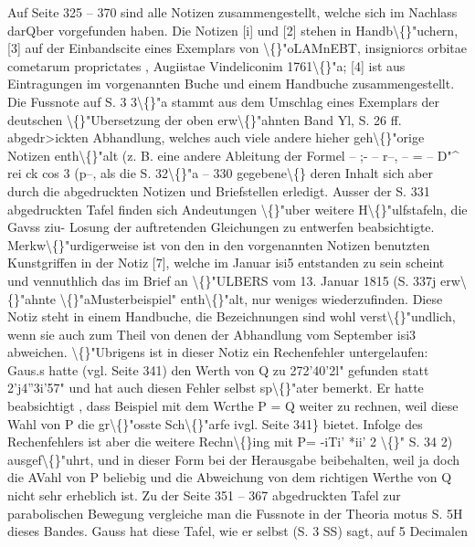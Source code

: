 \documentclass[10pt,a4paper]{article}
\begin{document}
Auf Seite 325 -- 370 sind alle Notizen zusammengestellt, welche sich im Nachlass darQber vorgefunden
haben. Die Notizen [i] und [2] stehen in Handb\textbackslash\{\}"uchern, [3] auf der Einbandscite eines Exemplars von
\textbackslash\{\}"oLAMnEBT, insigniorcs orbitae cometarum proprictates , Augiistae Vindeliconim 1761\textbackslash\{\}"a; [4] ist aus Eintragungen im vorgenannten Buche und einem Handbuche zusammengestellt. Die Fussnote auf S. 3 3\textbackslash\{\}"a stammt
aus dem Umschlag eines Exemplars der deutschen \textbackslash\{\}"Ubersetzung der oben erw\textbackslash\{\}"ahnten Band Yl, S. 26 ff. abgedr>ickten Abhandlung, welches auch viele andere hieher geh\textbackslash\{\}"orige Notizen enth\textbackslash\{\}"alt (z. B. eine andere Ableitung
der Formel -- ;- -- r--, -- = -- D"\textasciicircum{}
rei ck cos
3 (p--, als die S. 32\textbackslash\{\}"a -- 330 gegebene\textbackslash\{\} deren Inhalt sich aber durch die abgedruckten Notizen und Briefstellen erledigt. Ausser der S. 331 abgedruckten Tafel finden sich Andeutungen
\textbackslash\{\}"uber weitere H\textbackslash\{\}"ulfstafeln, die Gavss ziu- Losung der auftretenden Gleichungen zu entwerfen beabsichtigte.
Merkw\textbackslash\{\}"urdigerweise ist von den in den vorgenannten Notizen benutzten Kunstgriffen in der Notiz [7],
welche im Januar isi5 entstanden zu sein scheint und vennuthlich das im Brief an \textbackslash\{\}"ULBERS vom 13. Januar
1815 (S. 337j erw\textbackslash\{\}"ahnte \textbackslash\{\}"aMusterbeispiel" enth\textbackslash\{\}"alt, nur weniges wiederzufinden. Diese Notiz steht in einem
Handbuche, die Bezeichnungen sind wohl verst\textbackslash\{\}"undlich, wenn sie auch zum Theil von denen der Abhandlung
vom September isi3 abweichen. \textbackslash\{\}"Ubrigens ist in dieser Notiz ein Rechenfehler untergelaufen: Gaus.s hatte
(vgl. Seite 341) den Werth von Q zu 272'40'2l" gefunden statt 2'j4''3i'57" und hat auch diesen Fehler
selbst sp\textbackslash\{\}"ater bemerkt. Er hatte beabsichtigt , dass Beispiel mit dem Wcrthe P = Q weiter zu rechnen,
weil diese Wahl von P die gr\textbackslash\{\}"osste Sch\textbackslash\{\}"arfe ivgl. Seite 341\} bietet. Infolge des Rechenfehlers ist aber die
weitere Rechn\textbackslash\{\}ing mit P= -iTi' *ii' 2 \textbackslash\{\}" S. 34 2) ausgef\textbackslash\{\}"uhrt, und in dieser Form bei der Herausgabe beibehalten, weil ja doch die AVahl von P beliebig und die Abweichung von dem richtigen Werthe von Q nicht
sehr erheblich ist.
Zu der Seite 351 -- 367 abgedruckten Tafel zur parabolischen Bewegung vergleiche man die Fussnote
in der Theoria motus S. 5H dieses Bandes. Gauss hat diese Tafel, wie er selbst (S. 3 SS) sagt, auf 5 Decimalen
\end{document}
